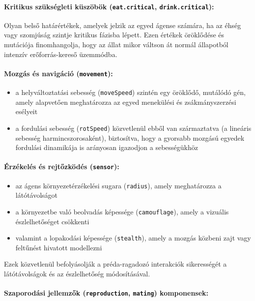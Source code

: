 \paragraph{Kritikus szükségleti küszöbök (\texttt{eat.critical}, \texttt{drink.critical}):} Olyan belső határértékek, amelyek jelzik az egyed ágense számára, ha az éhség vagy szomjúság szintje kritikus fázisba lépett. Ezen értékek öröklődése és mutációja finomhangolja, hogy az állat mikor váltson át normál állapotból intenzív erőforrás-kereső üzemmódba.

\paragraph{Mozgás és navigáció (\texttt{movement}):}
\begin{itemize}
	\item a helyváltoztatási sebesség (\texttt{moveSpeed}) szintén egy öröklődő, mutálódó gén, amely alapvetően meghatározza az egyed menekülési és zsákmányszerzési esélyeit
	\item a fordulási sebesség (\texttt{rotSpeed}) közvetlenül ebből van származtatva (a lineáris sebesség harmincszorosaként), biztosítva, hogy a gyorsabb mozgású egyedek fordulási dinamikája is arányosan igazodjon a sebességükhöz
\end{itemize}

\paragraph{Érzékelés és rejtőzködés (\texttt{sensor}):}
\begin{itemize}
	\item az ágens környezetérzékelési sugara (\texttt{radius}), amely meghatározza a látótávolságot
	\item a környezetbe való beolvadás képessége (\texttt{camouflage}),  amely a vizuális észlelhetőséget csökkenti
	\item valamint a lopakodási képessége (\texttt{stealth}), amely a mozgás közbeni zajt vagy feltűnést hivatott modellezni
\end{itemize}

Ezek közvetlenül befolyásolják a préda-ragadozó interakciók sikerességét a látótávolságok és az észlelhetőség módosításával.
    
\paragraph{Szaporodási jellemzők (\texttt{reproduction}, \texttt{mating}) komponensek:}

